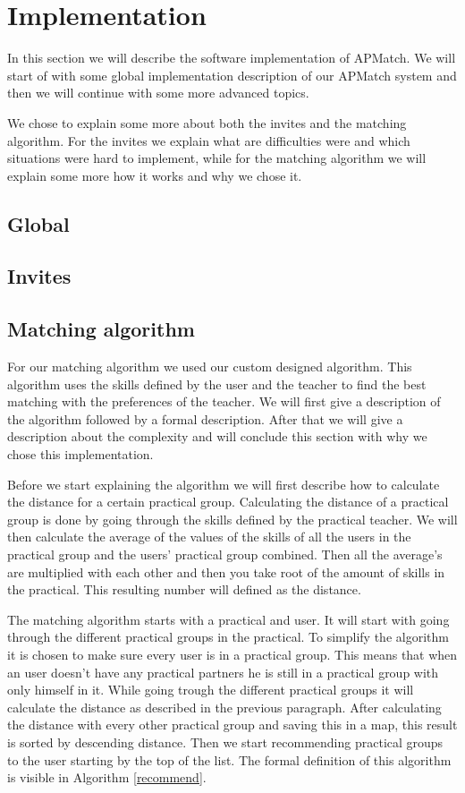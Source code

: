 \section{Implementation}
In this section we will describe the software implementation of APMatch.
We will start of with some global implementation description of our APMatch system and then we will continue with some more advanced topics.

We chose to explain some more about both the invites and the matching algorithm.
For the invites we explain what are difficulties were and which situations were hard to implement, while for the matching algorithm we will explain some more how it works and why we chose it.

\subsection{Global}

\subsection{Invites}

\subsection{Matching algorithm}
For our matching algorithm we used our custom designed algorithm.
This algorithm uses the skills defined by the user and the teacher to find the best matching with the preferences of the teacher.
We will first give a description of the algorithm followed by a formal description.
After that we will give a description about the complexity and will conclude this section with why we chose this implementation.

Before we start explaining the algorithm we will first describe how to calculate the distance for a certain practical group.
Calculating the distance of a practical group is done by going through the skills defined by the practical teacher.
We will then calculate the average of the values of the skills of all the users in the practical group and the users' practical group combined.
Then all the average's are multiplied with each other and then you take root of the amount of skills in the practical.
This resulting number will defined as the distance.

The matching algorithm starts with a practical and user.
It will start with going through the different practical groups in the practical.
To simplify the algorithm it is chosen to make sure every user is in a practical group.
This means that when an user doesn't have any practical partners he is still in a practical group with only himself in it.
While going trough the different practical groups it will calculate the distance as described in the previous paragraph.
After calculating the distance with every other practical group and saving this in a map, this result is sorted by descending distance.
Then we start recommending practical groups to the user starting by the top of the list.
The formal definition of this algorithm is visible in Algorithm \ref{recommend}.


